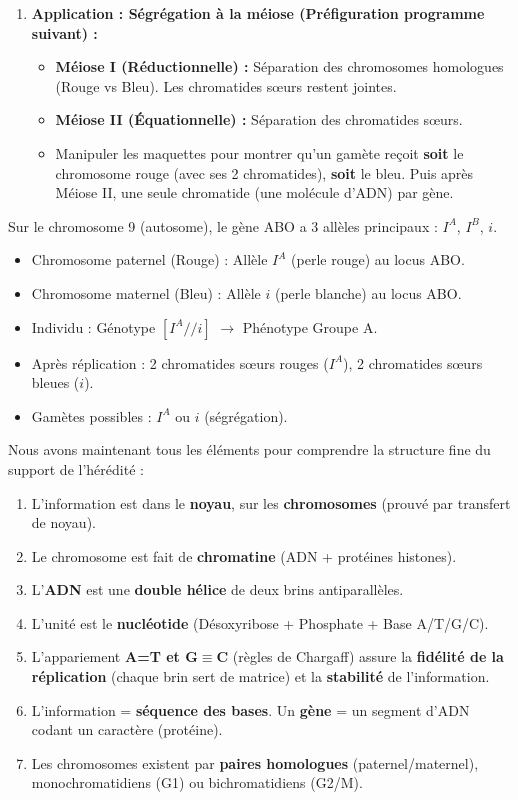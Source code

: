 \documentclass[11pt]{article}
\newcounter{popsec}
\newcounter{popsub}
\newcommand{\courssub}[1]{%
  \stepcounter{popsub}%
  \par\vspace{9pt}\noindent{\popxbold\fontsize{11.5}{13}\selectfont\color{popink}{\color{poporange}\thepopsec.\thepopsub}\hspace{6pt}#1}\par\nopagebreak\vspace{4pt}
}
\begin{document}
\begin{enumerate}
    \item \textbf{Application : Ségrégation à la méiose (Préfiguration programme suivant) :}
    \begin{itemize}
        \item \textbf{Méiose I (Réductionnelle) :} Séparation des chromosomes homologues (Rouge vs Bleu). Les chromatides sœurs restent jointes.
        \item \textbf{Méiose II (Équationnelle) :} Séparation des chromatides sœurs.
        \item Manipuler les maquettes pour montrer qu'un gamète reçoit \textbf{soit} le chromosome rouge (avec ses 2 chromatides), \textbf{soit} le bleu. Puis après Méiose II, une seule chromatide (une molécule d'ADN) par gène.
    \end{itemize}
\end{enumerate}

\begin{exemplebox}
Sur le chromosome 9 (autosome), le gène ABO a 3 allèles principaux : $I^A$, $I^B$, $i$.
\begin{itemize}
    \item Chromosome paternel (Rouge) : Allèle $I^A$ (perle rouge) au locus ABO.
    \item Chromosome maternel (Bleu) : Allèle $i$ (perle blanche) au locus ABO.
    \item Individu : Génotype $[I^A // i]$ $\rightarrow$ Phénotype Groupe A.
    \item Après réplication : 2 chromatides sœurs rouges ($I^A$), 2 chromatides sœurs bleues ($i$).
    \item Gamètes possibles : $I^A$ ou $i$ (ségrégation).
\end{itemize}
\end{exemplebox}

\courssub{Synthèse et ouverture}

Nous avons maintenant tous les éléments pour comprendre la structure fine du support de l'hérédité :
\begin{enumerate}
    \item L'information est dans le \textbf{noyau}, sur les \textbf{chromosomes} (prouvé par transfert de noyau).
    \item Le chromosome est fait de \textbf{chromatine} (ADN + protéines histones).
    \item L'\textbf{ADN} est une \textbf{double hélice} de deux brins antiparallèles.
    \item L'unité est le \textbf{nucléotide} (Désoxyribose + Phosphate + Base A/T/G/C).
    \item L'appariement \textbf{A=T et G$\equiv$C} (règles de Chargaff) assure la \textbf{fidélité de la réplication} (chaque brin sert de matrice) et la \textbf{stabilité} de l'information.
    \item L'information = \textbf{séquence des bases}. Un \textbf{gène} = un segment d'ADN codant un caractère (protéine).
    \item Les chromosomes existent par \textbf{paires homologues} (paternel/maternel), monochromatidiens (G1) ou bichromatidiens (G2/M).
\end{enumerate}
\end{document}
